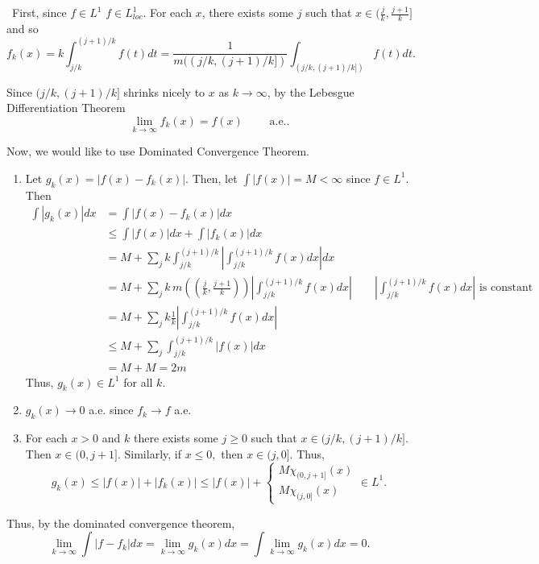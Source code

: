 \documentclass[12pt]{Qual}
\begin{document}
\begin{solution}$\,$
First, since $f\in L^1$ $f\in L_{loc}^1$. For each $x$, there exists some $j$ such that $x\in(\frac{j}{k},\frac{j+1}{k}]$ and so $$f_k(x)=k\int_{j/k}^{(j+1)/k}f(t)dt=\frac{1}{m((j/k,(j+1)/k])}\int_{(j/k,(j+1)/k])}f(t)dt.$$

Since $(j/k,(j+1)/k]$ shrinks nicely to $x$ as $k\to\infty$, by the Lebesgue Differentiation Theorem $$\lim_{k\to\infty}f_k(x)=f(x)\qquad\text{ a.e.}.$$

Now, we would like to use Dominated Convergence Theorem.
\begin{enumerate}
    \item Let $g_k(x)=|f(x)-f_k(x)|$. Then, let $\int|f(x)|=M<\infty$ since $f\in L^1$. Then \begin{align*}
        \int|g_k(x)|dx&=\int|f(x)-f_k(x)|dx\\
        &\le\int|f(x)|dx+\int|f_k(x)|dx\\
        &=M+\sum_jk\int_{j/k}^{(j+1)/k}\left|\int_{j/k}^{(j+1)/k}f(x)dx\right|dx\\
        &=M+\sum_jk\,m\left((\frac{j}{k},\frac{j+1}{k})\right)\left|\int_{j/k}^{(j+1)/k}f(x)dx\right|\qquad\left|\int_{j/k}^{(j+1)/k} f(x)dx\right|\text{ is constant}\\
        &=M+\sum_jk\frac{1}{k}\left|\int_{j/k}^{(j+1)/k}f(x)dx\right|\\
        &\le M+\sum_j\int_{j/k}^{(j+1)/k}|f(x)|dx\\
        &=M+M=2m
    \end{align*}
    Thus, $g_k(x)\in L^1$ for all $k$.
    \item $g_k(x)\to0$ a.e. since $f_k\to f$ a.e.
    \item For each $x>0$ and $k$ there exists some $j\ge0$ such that $x\in(j/k,(j+1)/k].$ Then $x\in(0,j+1]$. Similarly, if $x\le0,$ then $x\in(j,0]$. Thus, $$g_k(x)\le|f(x)|+|f_k(x)|\le |f(x)|+\begin{cases}
    M\chi_{(0,j+1]}(x)\\
    M\chi_{(j,0]}(x)
    \end{cases}\in L^1.$$
\end{enumerate}

Thus, by the dominated convergence theorem, $$\lim_{k\to\infty}\int|f-f_k|dx=\lim_{k\to\infty}g_k(x)dx=\int\lim_{k\to\infty}g_k(x)dx=0.$$
\end{solution}
\newpage
\end{document}
